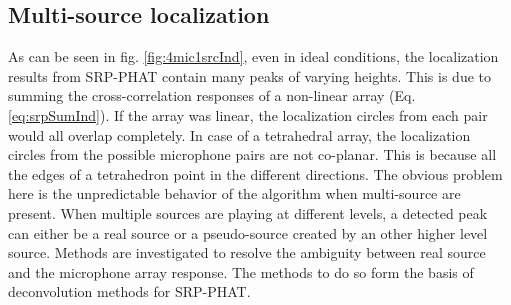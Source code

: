 \subsection{Multi-source localization}
As can be seen in fig. \ref{fig:4mic1srcInd}, even in ideal conditions, the localization results from SRP-PHAT contain many peaks of varying heights. This is due to summing the cross-correlation responses of a non-linear array (Eq. \ref{eq:srpSumInd}). If the array was linear, the localization circles from each pair would all overlap completely. In case of a tetrahedral array, the localization circles from the possible microphone pairs are not co-planar. This is because all the edges of a tetrahedron point in the different directions. The obvious problem here is the unpredictable behavior of the algorithm when multi-source are present. When multiple sources are playing at different levels, a detected peak can either be a real source or a pseudo-source created by an other higher level source. Methods are investigated to resolve the ambiguity between real source and the microphone array response. The methods to do so form the basis of deconvolution methods for SRP-PHAT.
